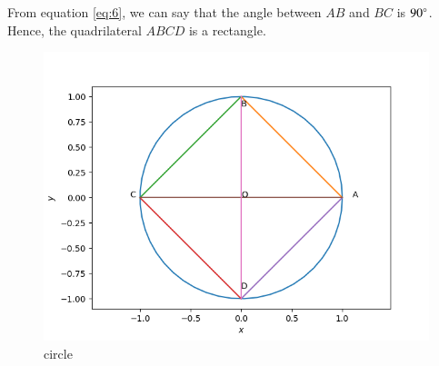 \documentclass[journal,12pt,twocolumn]{IEEEtran}
\begin{document}
\begin{enumerate}
    From equation \eqref{eq:6}, we can say that the angle between $AB$ and $BC$ is $90\degree$.
    Hence, the quadrilateral $ABCD$ is a rectangle.
\end{enumerate}

\begin{figure}[!htb]
    \centering
    \includegraphics[width=\columnwidth]{figs/circle.png}
    \caption{circle}
    \label{fig:circle}
\end{figure}
\end{document}
